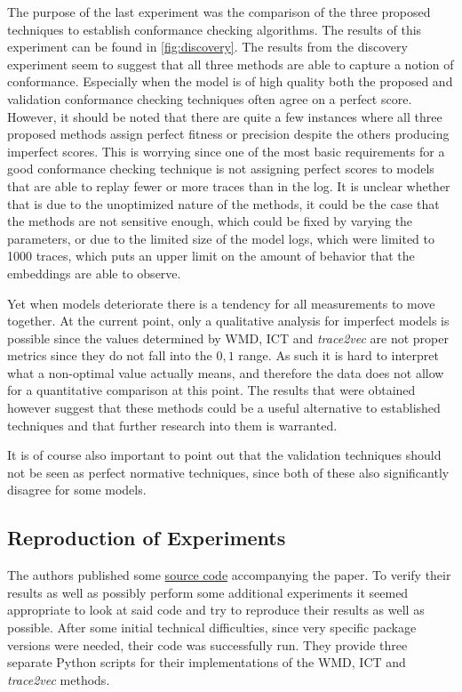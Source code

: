 \documentclass[runningheads]{template/llncs}
\begin{document}
The purpose of the last experiment was the comparison of the three proposed techniques to establish conformance checking algorithms.
The results of this experiment can be found in \cref{fig:discovery}.
The results from the discovery experiment seem to suggest that all three methods are able to capture a notion of conformance.
Especially when the model is of high quality both the proposed and validation conformance checking techniques often agree on a perfect score.
However, it should be noted that there are quite a few instances where all three proposed methods assign perfect fitness or precision despite the others producing imperfect scores.
This is worrying since one of the most basic requirements for a good conformance checking technique is not assigning perfect scores to models that are able to replay fewer or more traces than in the log.
It is unclear whether that is due to the unoptimized nature of the methods, it could be the case that the methods are not sensitive enough, which could be fixed by varying the parameters, or due to the limited size of the model logs, which were limited to 1000 traces, which puts an upper limit on the amount of behavior that the embeddings are able to observe.

Yet when models deteriorate there is a tendency for all measurements to move together.
At the current point, only a qualitative analysis for imperfect models is possible since the values determined by WMD, ICT and \emph{trace2vec} are not proper metrics since they do not fall into the $0,1$ range.
As such it is hard to interpret what a non-optimal value actually means, and therefore the data does not allow for a quantitative comparison  at this point.
The results that were obtained however suggest that these methods could be a useful alternative to established techniques and that further research into them is warranted.

It is of course also important to point out that the validation techniques should not be seen as perfect normative techniques, since both of these also significantly disagree for some models. 

\subsection{Reproduction of Experiments}
The authors published some \href{https://github.com/jaripeeperkorn/Conformance-checking-using-activity-and-trace-embeddings}{source code} accompanying the paper.
To verify their results as well as possibly perform some additional experiments it seemed appropriate to look at said code and try to reproduce their results as well as possible.
After some initial technical difficulties, since very specific package versions were needed, their code was successfully run.
They provide three separate Python scripts for their implementations of the  WMD, ICT and \emph{trace2vec} methods.
\end{document}
